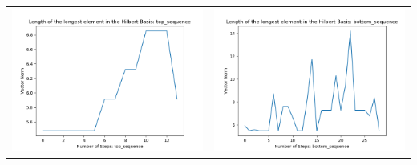 \documentclass[10pt]{article}
\begin{document}
\begin{tabular}{c|c}
\begin{minipage}{.4\textwidth}
\includegraphics[width=\textwidth]{"DATA/5d/6 generators 2 bound D/top_sequence LENGTH"}
\end{minipage} &
\begin{minipage}{.4\textwidth}
\includegraphics[width=\textwidth]{"DATA/5d/6 generators 2 bound D bottomup/bottom_sequence LENGTH"}
\end{minipage}
\end{tabular}
\end{document}

